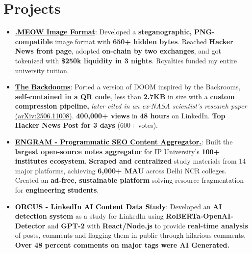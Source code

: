 \documentclass[letterpaper,10.8pt]{article}
\let\oldhref\href
\renewcommand{\href}[2]{\oldhref{#1}{\textcolor{linkgrey}{\uline{\textcolor{black}{#2}}}}}
\newcommand{\resumeItem}[2]{
  \item\small{
    \textbf{#1}{: #2 \vspace{-2pt}}
  }
}
\newcommand{\resumeSubHeadingListStart}{\begin{itemize}[leftmargin=*]}
\newcommand{\resumeSubHeadingListEnd}{\end{itemize}}
\begin{document}
\section*{Projects}
\resumeSubHeadingListStart
\resumeItem{\href{https://github.com/kuberwastaken/meow}{.MEOW Image Format}}{Developed a \textbf{steganographic,} \textbf{PNG-compatible} image format with \textbf{650+ hidden bytes}. Reached \textbf{Hacker News front page}, adopted \textbf{on-chain by two exchanges}, and got tokenized with \textbf{\$250k liquidity in 3 nights}. Royalties funded my entire university tuition.}
  \vspace{5pt}
\resumeItem{\href{https://github.com/Kuberwastaken/backdooms}{The Backdooms}}{Ported a version of DOOM inspired by the Backrooms, \textbf{self-contained in a QR code}, less than \textbf{2.7KB} in size with a \textbf{custom compression pipeline,} \textit{later cited in an ex-NASA scientist's research paper} \href{https://arxiv.org/pdf/2506.11008}{(arXiv:2506.11008)}. \textbf{400,000+ views} in \textbf{48 hours} on LinkedIn. \textbf{Top Hacker News Post for 3 days} (600+ votes).}
  \vspace{5pt}
  \resumeItem{\href{https://engram.kuber.studio/}{ENGRAM - Programmatic SEO Content Aggregator.}}{Built the \textbf{largest open-source notes aggregator} for IP University's \textbf{100+ institutes ecosystem}. \textbf{Scraped and centralized} study materials from 14 major platforms, achieving \textbf{6,000+ MAU} across Delhi NCR colleges. Created an \textbf{ad-free, sustainable platform} solving resource fragmentation for \textbf{engineering students}.}
  \vspace{5pt}
  \resumeItem{\href{https://www.linkedin.com/in/orcus-ai/}{ORCUS - LinkedIn AI Content Data Study}}{Developed an \textbf{AI detection system} as a study for LinkedIn using \textbf{RoBERTa-OpenAI-Detector} and \textbf{GPT-2} with \textbf{React/Node.js} to provide \textbf{real-time analysis} of posts, comments and flagging them in public through hilarious comments.\textbf{ Over 48 percent comments on major tags were AI Generated.}}
\resumeSubHeadingListEnd
\end{document}
